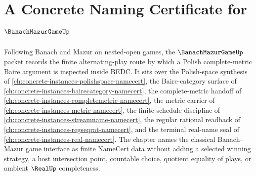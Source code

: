 \chapter{A Concrete Naming Certificate for $\BanachMazurGameUp$}
\label{ch:concrete-instances-banach-mazur-game-namecert}

Following Banach and Mazur on nested-open games, the $\BanachMazurGameUp$ packet records the finite alternating-play route by which a Polish complete-metric Baire argument is inspected inside BEDC. It sits over the Polish-space synthesis of \autoref{ch:concrete-instances-polishspace-namecert}, the Baire-category surface of \autoref{ch:concrete-instances-bairecategory-namecert}, the complete-metric handoff of \autoref{ch:concrete-instances-completemetric-namecert}, the metric carrier of \autoref{ch:concrete-instances-metric-namecert}, the finite schedule discipline of \autoref{ch:concrete-instances-streamname-namecert}, the regular rational readback of \autoref{ch:concrete-instances-regseqrat-namecert}, and the terminal real-name seal of \autoref{ch:concrete-instances-real-namecert}. The chapter names the classical Banach--Mazur game interface as finite NameCert data without adding a selected winning strategy, a host intersection point, countable choice, quotient equality of plays, or ambient $\RealUp$ completeness.

